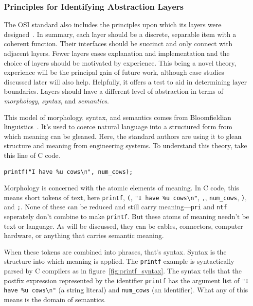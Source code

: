 \documentclass[english,12pt,a4paper,pdftex,eng,utf8]{aaltothesis}
\begin{document}
\subsubsection{Principles for Identifying Abstraction Layers}

The OSI standard also includes the principles upon which its layers were designed~\cite[§6.2.1]{ISO7498-1}. In summary, each layer should be a discrete, separable item with a coherent function. Their interfaces should be succinct and only connect with adjacent layers. Fewer layers eases explanation and implementation and the choice of layers should be motivated by experience. This being a novel theory, experience will be the principal gain of future work, although case studies discussed later will also help. Helpfully, it offers a test to aid in determining layer boundaries. Layers should have a different level of abstraction in terms of \textit{morphology}, \textit{syntax}, and \textit{semantics}.

This model of morphology, syntax, and semantics comes from Bloomfieldian linguistics~\cite{Bloomfield1923}. It's used to coerce natural language into a structured form from which meaning can be gleaned. Here, the standard authors are using it to glean structure and meaning from engineering systems. To understand this theory, take this line of C code.

\begin{verbatim}
printf("I have %u cows\n", num_cows);
\end{verbatim}

Morphology is concerned with the atomic elements of meaning. In C code, this means short tokens of text, here \verb|printf|, \verb|(|, \verb|"I have %u cows\n"|, \verb|,|, \verb|num_cows|, \verb|)|, and \verb|;|. None of these can be reduced and still carry meaning---\verb|pri| and \verb|ntf| seperately don't combine to make \verb|printf|. But these atoms of meaning needn't be text or language. As will be discussed, they can be cables, connectors, computer hardware, or anything that carries semantic meaning.

When these tokens are combined into phrases, that's syntax. Syntax is the structure into which meaning is applied. The \verb|printf| example is syntactically parsed by C compilers as in figure~\ref{fig:printf_syntax}. The syntax tells that the postfix expression represented by the identifier \verb|printf| has the argument list of \verb|"I have %u cows\n"| (a string literal) and \verb|num_cows| (an identifier). What any of this means is the domain of semantics.
\end{document}
